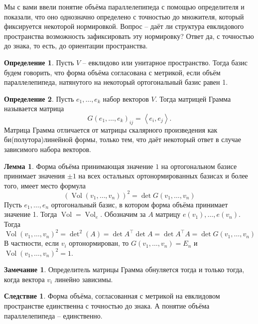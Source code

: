 \documentclass[10pt,a4paper,oneside]{book}
\theoremstyle{definition}
\newtheorem*{rem}{Замечание}
\newtheorem{zad}{Задача}
\newtheorem*{defn}{Определение}
\newtheorem{lem}{Лемма}
\newtheorem{cor}{Следствие}
\newcommand{\Vol}{\operatorname{Vol}}
\def\lan{\left\langle }
\def\ran{\right\rangle}
\def\dfn{\begin{defn}}
\def\edfn{\end{defn}}
\def\lm{\begin{lem}}
\def\elm{\end{lem}}
\def\zd{\begin{zad}}
\def\ezd{\end{zad}}
\def\crl{\begin{cor}}
\def\ecrl{\end{cor}}
\def\rm{\begin{rem}}
\def\erm{\end{rem}}
\begin{document}
Мы с вами ввели понятие объёма параллелепипеда с помощью определителя и показали, что оно однозначно определено с точностью до множителя, который фиксируется некоторой нормировкой. Вопрос -- даёт ли структура евклидового пространства возможность зафиксировать эту нормировку? Ответ да, с точностью до знака, то есть, до ориентации пространства.

\dfn Пусть $V$ -- евклидово или унитарное пространство. Тогда базис будем говорить, что форма объёма согласована с метрикой, если объём параллелепипеда, натянутого на некоторый ортогональный базис равен 1.
\edfn

\dfn Пусть $e_1,\dots, e_k$ набор векторов $V$. Тогда матрицей Грамма называется матрица 
$$G(e_1,\dots,e_k)_{ij}= \lan e_i, e_j\ran.$$
Матрица Грамма отличается от матрицы скалярного произведения как би(полутора)линейной формы, только тем, что даёт некоторый ответ в случае зависимого набора векторов. 
\edfn

\lm
Форма объёма принимающая значение $1$ на ортогональном базисе принимает значения $\pm 1$ на всех остальных ортонормированных базисах и более того, имеет место формула
$$(\Vol(v_1,\dots,v_n))^2= \det G(v_1,\dots,v_n)$$
\proof Пусть $e_1,\dots,e_n$ ортогональный базис, в котором форма объёма принимает значение 1. Тогда $\Vol= \Vol_e$. Обозначим за $A$ матрицу $e(v_1),\dots,e(v_n)$. Тогда $$\Vol(v_1,\dots,v_n)^2= \det\nolimits^2 (A)= \det A^{\top} \det A= \det A^{\top}A= \det G(v_1,\dots,v_n)$$
В частности, если $v_i$ ортонормирован, то $G(v_1,\dots,v_n)=E_n$ и $\Vol(v_1,\dots,v_n)^2=1$.
\endproof
\elm

\rm Определитель матрицы Грамма обнуляется тогда и только тогда, когда вектора $v_i$ линейно зависимы.
\erm

\crl Форма объёма, согласованная с метрикой на евклидовом пространстве единственна с точностью до знака. А понятие объёма параллелепипеда -- единственно.
\ecrl


\begin{comment}

Так же можно дать явную формулу для расстояния через определители.
\lm Пусть подпространство $U$ имеет базис $e_1,\dots,e_k$. Тогда $\rho(x_0, U)^2 = \frac{\det G(e_1,\dots,e_k,x_0)}{\det G(e_1,\dots,e_k)}$ 
\elm 



\dfn $V$ --- евклидово пространство $U$ -- его подпространство, а $x_0$ вектор из $V$. Определим косинус угла $\angle x_0,U$ как 
$$\cos \angle x_0,U=\sup_{0\neq y\in U} \cos \angle x_0,y =\sup_{0\neq y\in U} \frac{|\lan x_0,y\ran| }{\|x_0\|\|y\|}.$$  
То есть мы ищем минимальный угол из отрезка $[0,\frac{\pi}{2}]$. Заметим, что в евклидовом случае отрицательные косинусы не имеют смысла, так как всегда можно домножить $y$ на $-1$.
\edfn

\lm Наименьший угол достигается между $x_0$ и его проекцией на $U$ и его косинус равен $\frac{\|pr_{U}x_0\|}{\|x_0\|}$.  
\elm


\zd Докажите аналогичное свойство в унитарном случае.
\ezd


\end{comment}
\end{document}
